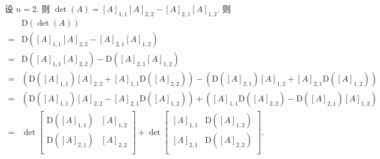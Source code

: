 \documentclass[../libro.tex]{subfiles}
\begin{document}
\begin{example}
    设 \(n = 2\).
    则 \(\det {(A)} = [A]_{1,1} [A]_{2,2} - [A]_{2,1} [A]_{1,2}\).
    则
    \begin{align*}
        &
        \mathrm{D} (\det {(A)})
        \\
        = {} &
        \mathrm{D} ([A]_{1,1} [A]_{2,2} - [A]_{2,1} [A]_{1,2})
        \\
        = {} &
        \mathrm{D} ([A]_{1,1} [A]_{2,2})
        - \mathrm{D} ([A]_{2,1} [A]_{1,2})
        \\
        = {} &
        (\mathrm{D} ([A]_{1,1}) [A]_{2,2} + [A]_{1,1} \mathrm{D} ([A]_{2,2}))
        -
        (\mathrm{D} ([A]_{2,1}) [A]_{1,2} + [A]_{2,1} \mathrm{D} ([A]_{1,2}))
        \\
        = {} &
        (\mathrm{D} ([A]_{1,1}) [A]_{2,2} - [A]_{2,1} \mathrm{D} ([A]_{1,2}))
        +
        ([A]_{1,1} \mathrm{D} ([A]_{2,2}) - \mathrm{D} ([A]_{2,1}) [A]_{1,2})
        \\
        = {} &
        \det {
            \begin{bmatrix}
                \mathrm{D} ([A]_{1,1}) & [A]_{1,2} \\
                \mathrm{D} ([A]_{2,1}) & [A]_{2,2} \\
        \end{bmatrix}}
        +
        \det {
            \begin{bmatrix}
                [A]_{1,1} & \mathrm{D} ([A]_{1,2}) \\
                [A]_{2,1} & \mathrm{D} ([A]_{2,2}) \\
        \end{bmatrix}}.
    \end{align*}


\end{example}
\end{document}

